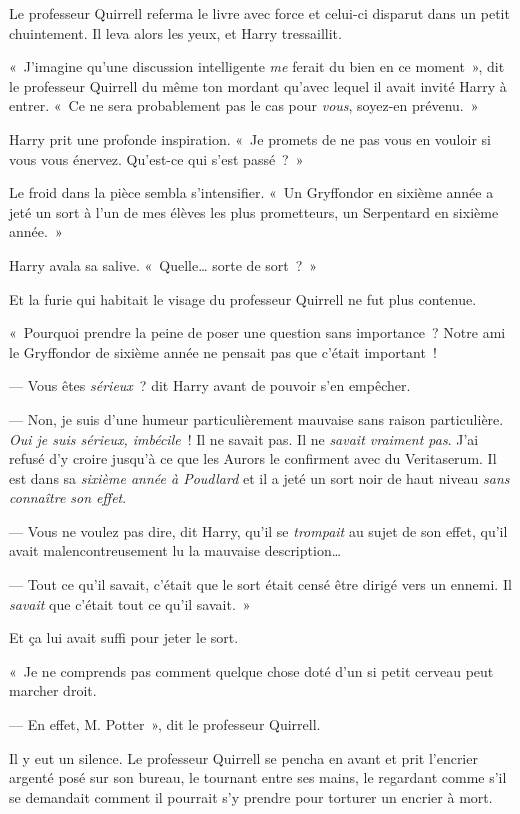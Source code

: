 Le professeur Quirrell referma le livre avec force et celui-ci disparut dans un petit chuintement.
Il leva alors les yeux, et Harry tressaillit.

«~J'imagine qu'une discussion intelligente \emph{me} ferait du bien en ce moment~», dit le professeur Quirrell du même ton mordant qu'avec lequel il avait invité Harry à entrer.
«~Ce ne sera probablement pas le cas pour \emph{vous}, soyez-en prévenu.~»

Harry prit une profonde inspiration.
«~Je promets de ne pas vous en vouloir si vous vous énervez.
Qu'est-ce qui s'est passé~?~»

Le froid dans la pièce sembla s'intensifier.
«~Un Gryffondor en sixième année a jeté un sort à l'un de mes élèves les plus prometteurs, un Serpentard en sixième année.~»

Harry avala sa salive.
«~Quelle… sorte de sort~?~»

Et la furie qui habitait le visage du professeur Quirrell ne fut plus contenue.

«~Pourquoi prendre la peine de poser une question sans importance~?
Notre ami le Gryffondor de sixième année ne pensait pas que c'était important~!

--- Vous êtes \emph{sérieux}~? dit Harry avant de pouvoir s'en empêcher.

--- Non, je suis d'une humeur particulièrement mauvaise sans raison particulière.
\emph{Oui je suis sérieux, imbécile}~!
Il ne savait pas.
Il ne \emph{savait vraiment pas}.
J'ai refusé d'y croire jusqu'à ce que les Aurors le confirment avec du Veritaserum.
Il est dans sa \emph{sixième année à Poudlard} et il a jeté un sort noir de haut niveau \emph{sans connaître son effet}.

--- Vous ne voulez pas dire, dit Harry, qu'il se \emph{trompait} au sujet de son effet, qu'il avait malencontreusement lu la mauvaise description…

--- Tout ce qu'il savait, c'était que le sort était censé être dirigé vers un ennemi.
Il \emph{savait} que c'était tout ce qu'il savait.~»

Et ça lui avait suffi pour jeter le sort.

«~Je ne comprends pas comment quelque chose doté d'un si petit cerveau peut marcher droit.

--- En effet, M. Potter~», dit le professeur Quirrell.

Il y eut un silence.
Le professeur Quirrell se pencha en avant et prit l'encrier argenté posé sur son bureau, le tournant entre ses mains, le regardant comme s'il se demandait comment il pourrait s'y prendre pour torturer un encrier à mort.

